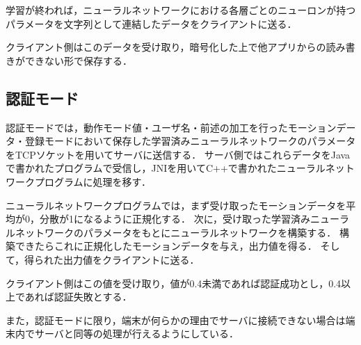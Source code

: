 学習が終われば，ニューラルネットワークにおける各層ごとのニューロンが持つパラメータを文字列として連結したデータをクライアントに送る．

クライアント側はこのデータを受け取り，暗号化した上で他アプリからの読み書きができない形で保存する．

\subsection{認証モード}
認証モードでは，動作モード値・ユーザ名・前述の加工を行ったモーションデータ・登録モードにおいて保存した学習済みニューラルネットワークのパラメータをTCPソケットを用いてサーバに送信する．
サーバ側ではこれらデータをJavaで書かれたプログラムで受信し，JNIを用いてC++で書かれたニューラルネットワークプログラムに処理を移す．

ニューラルネットワークプログラムでは，まず受け取ったモーションデータを平均が0，分散が1になるように正規化する．
次に，受け取った学習済みニューラルネットワークのパラメータをもとにニューラルネットワークを構築する．
構築できたらこれに正規化したモーションデータを与え，出力値を得る．
そして，得られた出力値をクライアントに送る．

クライアント側はこの値を受け取り，値が0.4未満であれば認証成功とし，0.4以上であれば認証失敗とする．

また，認証モードに限り，端末が何らかの理由でサーバに接続できない場合は端末内でサーバと同等の処理が行えるようにしている．
